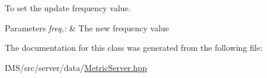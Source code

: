 To set the update frequency value. 


\begin{DoxyParams}{Parameters}
{\em freq,:} & The new frequency value \\
\hline
\end{DoxyParams}


The documentation for this class was generated from the following file:\begin{DoxyCompactItemize}
\item 
IMS/src/server/data/\hyperlink{MetricServer_8hpp}{MetricServer.hpp}\end{DoxyCompactItemize}
